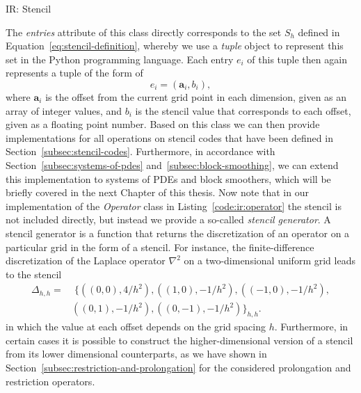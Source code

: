 \begin{listing}
	\inputminted{python}{evostencils/ir/stencil.py}
	\caption{IR: Stencil}
	\label{code:ir:stencil}
\end{listing}
The \emph{entries} attribute of this class directly corresponds to the set $S_h$ defined in Equation~\ref{eq:stencil-definition}, whereby we use a \emph{tuple} object to represent this set in the Python programming language.
Each entry $e_i$ of this tuple then again represents a tuple of the form of
\begin{equation}
	e_i = \left(\bm{a}_i, b_i \right),
\end{equation} 
where $\bm{a}_i$ is the offset from the current grid point in each dimension, given as an array of integer values, and $b_i$ is the stencil value that corresponds to each offset, given as a floating point number.
Based on this class we can then provide implementations for all operations on stencil codes that have been defined in Section~\ref{subsec:stencil-codes}.
Furthermore, in accordance with Section~\ref{subsec:systems-of-pdes} and~\ref{subsec:block-smoothing}, we can extend this implementation to systems of PDEs and block smoothers, which will be briefly covered in the next Chapter of this thesis. %
Now note that in our implementation of the \emph{Operator} class in Listing~\ref{code:ir:operator} the stencil is not included directly, but instead we provide a so-called \emph{stencil generator}.
A stencil generator is a function that returns the discretization of an operator on a particular grid in the form of a stencil.
For instance, the finite-difference discretization of the Laplace operator $\nabla^2$ on a two-dimensional uniform grid leads to the stencil 
\begin{equation*}
	\begin{split}
		\Delta_{h,h} = & \; \big\{ \left( \left( 0,0 \right), 4 / h^2 \right), \left(\left(1,0\right), -1/h^2\right), \left(\left(-1,0\right), -1 / h^2\right), \\ & \left(\left(0,1\right), -1/h^2\right), \left(\left(0,-1\right), -1/h^2\right) \big\}_{h,h}.
	\end{split}
\end{equation*}
in which the value at each offset depends on the grid spacing $h$.
Furthermore, in certain cases it is possible to construct the higher-dimensional version of a stencil from its lower dimensional counterparts, as we have shown in Section~\ref{subsec:restriction-and-prolongation} for the considered prolongation and restriction operators.
